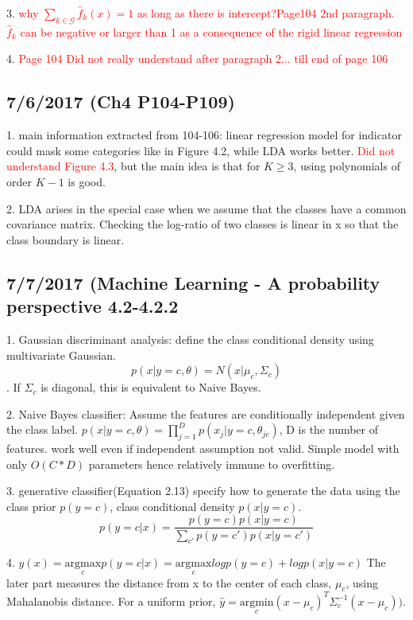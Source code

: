 \documentclass[a4paper, 12pt]{article}
\begin{document}
3. \textcolor{red}{why $\sum_{k \in \mathcal{G}}^{}\hat{f}_k(x)=1$ as long as there is intercept?Page104 2nd paragraph. $\hat{f}_k$ can be negative or larger than 1 as a consequence of the rigid linear regression}

4. \textcolor{red}{Page 104 Did not really understand after paragraph 2... till end of page 106 }

\subsection*{7/6/2017 (Ch4 P104-P109)}

1. main information extracted from 104-106: linear regression model for indicator could mask some categories like in Figure 4.2, while LDA works better.  \textcolor{red}{Did not understand Figure 4.3}, but the main idea is that for $K \ge 3$, using polynomials of order $K-1$ is good.

2. LDA arises in the special case when we assume that the classes have a common covariance matrix. Checking the log-ratio of two classes is linear in x so that the class boundary is linear.

\subsection*{7/7/2017 (Machine Learning - A probability perspective 4.2-4.2.2}

1. Gaussian discriminant analysis: define the class conditional density using multivariate Gaussian. $$p(x|y=c,\theta)=N(x|\mu_c,\Sigma_c)$$. If $\Sigma_c$ is diagonal, this is equivalent to Naive Bayes.

2. Naive Bayes classifier: Assume the features are conditionally independent given the class label. $p(x|y=c,\theta)=\prod_{j=1}^{D}p(x_j|y=c,\theta_{jc})$, D is the number of features. work well even if independent assumption not valid. Simple model with only $O(C*D)$ parameters hence relatively immune to overfitting.

3. generative classifier(Equation 2.13) specify how to generate the data using the class prior $p(y=c)$, class conditional density $p(x|y=c)$.
$$p(y=c|x)=\frac{p(y=c)p(x|y=c)}{\sum_{c'}^{}p(y=c')p(x|y=c')}$$

4. $\hat{y}(x)=\underset{c}{\mathrm{argmax}} p(y=c|x)= \underset{c}{\mathrm{argmax}} logp(y=c) + logp(x|y=c) $ The later part measures the distance from x to the center of each class, $\mu_c$, using Mahalanobis distance. For a uniform prior, $\hat{y}=\underset{c}{\mathrm{argmin}} (x-\mu_c)^T\Sigma_c^{-1}(x-\mu_c))$.
\end{document}
